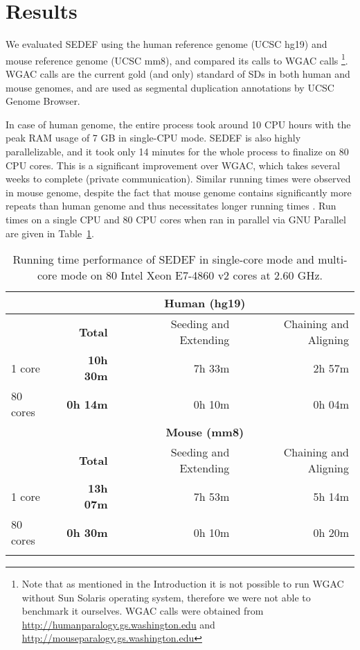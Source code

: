 \documentclass{article}
\begin{document}
\section{Results}
We evaluated SEDEF using the human reference genome (UCSC hg19) and mouse reference genome (UCSC mm8), and compared its calls to WGAC calls \footnote{Note that as mentioned in the Introduction it is not possible to run WGAC without Sun Solaris operating system, therefore we were not able to benchmark it ourselves. WGAC calls were obtained from \url{http://humanparalogy.gs.washington.edu} and \url{http://mouseparalogy.gs.washington.edu}}. WGAC calls are the current gold (and only) standard of SDs in both human and mouse genomes, and are used as segmental duplication annotations by UCSC Genome Browser.

In case of human genome, the entire process took around 10 CPU hours with the peak RAM usage of 7 GB in single-CPU mode. SEDEF is also highly parallelizable, and it took only 14 minutes for the whole process to finalize on 80 CPU cores. This is a significant improvement over WGAC, which takes several weeks to complete (private communication). Similar running times were observed in mouse genome, despite the fact that mouse genome contains significantly more repeats than human genome and thus necessitates longer running times \citep{she2008mouse}. Run times on a single CPU and 80 CPU cores when ran in parallel via GNU Parallel \citep{Tange2011a} are given in Table~\ref{tab:runtime}.

\begin{table}[htb!]
  \centering
\caption{Running time performance of SEDEF in single-core mode and multi-core mode on 80 Intel Xeon E7-4860 v2 cores at 2.60 GHz.}
\begin{tabular}{lrrr}
   & \multicolumn{3}{c}{\bf Human (hg19)} \\ \hline
  & \textbf{Total } & Seeding and Extending & Chaining and Aligning \\ \hline
1 core       
& \textbf{10h 30m}  & 7h 33m     & 2h 57m\\
80 cores     
    & \textbf{0h 14m}   & 0h 10m      & 0h 04m \\
\hline
  & \multicolumn{3}{c}{\bf Mouse (mm8)} \\ \hline
& \textbf{Total } & Seeding and Extending & Chaining and Aligning\\ \hline
1 core       
    & \textbf{13h 07m}  & 7h 53m     & 5h 14m \\
80 cores     
    & \textbf{0h 30m}   & 0h 10m      & 0h 20m  \\ 
\hline
\label{tab:runtime}
\end{tabular}
\end{table}
\end{document}
